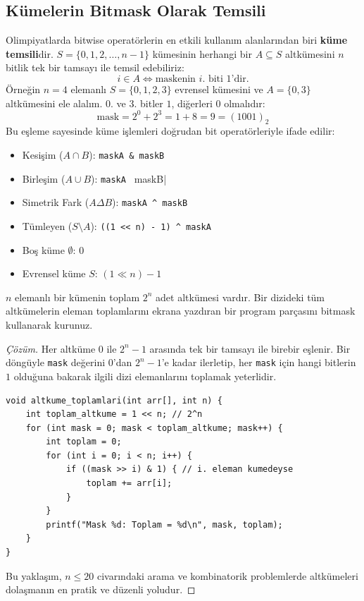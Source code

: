 \subsection{Kümelerin Bitmask Olarak Temsili}

Olimpiyatlarda bitwise operatörlerin en etkili kullanım alanlarından biri \textbf{küme temsili}dir.
$S = \{0, 1, 2, \dots, n-1\}$ kümesinin herhangi bir $A \subseteq S$ altkümesini $n$ bitlik tek bir tamsayı ile temsil edebiliriz:
\[
i \in A \iff \text{maskenin } i\text{. biti } 1\text{'dir.}
\]
Örneğin $n=4$ elemanlı $S=\{0, 1, 2, 3\}$ evrensel kümesini ve $A = \{0, 3\}$ altkümesini ele alalım. $0$. ve $3$. bitler $1$, diğerleri $0$ olmalıdır:
\[
\text{mask} = 2^0 + 2^3 = 1 + 8 = 9 = (1001)_2
\]
Bu eşleme sayesinde küme işlemleri doğrudan bit operatörleriyle ifade edilir:
\begin{itemize}
    \item Kesişim ($A \cap B$): \lstinline|maskA & maskB|
    \item Birleşim ($A \cup B$): \lstinline|maskA | maskB|
    \item Simetrik Fark ($A \Delta B$): \lstinline|maskA ^ maskB|
    \item Tümleyen ($S \setminus A$): \lstinline|((1 << n) - 1) ^ maskA|
    \item Boş küme $\emptyset$: $0$
    \item Evrensel küme $S$: $(1 \ll n) - 1$
\end{itemize}

\begin{example}
$n$ elemanlı bir kümenin toplam $2^n$ adet altkümesi vardır. Bir dizideki tüm altkümelerin eleman toplamlarını ekrana yazdıran bir program parçasını bitmask kullanarak kurunuz.
\end{example}

\begin{proof}[Çözüm]
Her altküme $0$ ile $2^n - 1$ arasında tek bir tamsayı ile birebir eşlenir. Bir döngüyle \lstinline|mask| değerini $0$'dan $2^n - 1$'e kadar ilerletip, her \lstinline|mask| için hangi bitlerin $1$ olduğuna bakarak ilgili dizi elemanlarını toplamak yeterlidir.

\begin{lstlisting}[language=CTemel]
void altkume_toplamlari(int arr[], int n) {
    int toplam_altkume = 1 << n; // 2^n
    for (int mask = 0; mask < toplam_altkume; mask++) {
        int toplam = 0;
        for (int i = 0; i < n; i++) {
            if ((mask >> i) & 1) { // i. eleman kumedeyse
                toplam += arr[i];
            }
        }
        printf("Mask %d: Toplam = %d\n", mask, toplam);
    }
}
\end{lstlisting}
Bu yaklaşım, $n \le 20$ civarındaki arama ve kombinatorik problemlerde altkümeleri dolaşmanın en pratik ve düzenli yoludur.
\end{proof}

